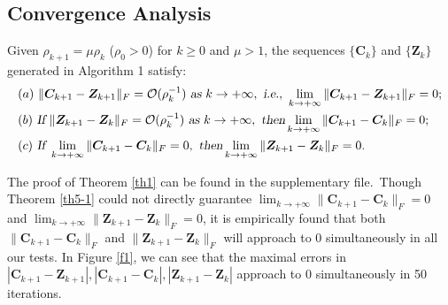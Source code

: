 \subsection{Convergence Analysis}


\begin{theorem}
\label{th5-1}
Given $\rho_{k+1}=\mu\rho_{k}$ ($\rho_{0}>0$) for $k\ge0$ and $\mu>1$, the sequences $\{\bm{C}_{k}\}$ and $\{\bm{Z}_{k}\}$ generated in Algorithm 1 satisfy:
\begin{align}
&
(a)\ 
\|\bm{C}_{k+1}-\bm{Z}_{k+1}\|_{F}=\mathcal{O}(\rho_{k}^{-1})
\ 
\textsl{as}\ k \to +\infty
,\ 
\textsl{i.e.},\ 
\lim_{k \to +\infty} \|\bm{C}_{k+1}-\bm{Z}_{k+1}\|_{F}=0;
\\
&
(b)\ 
\textsl{If}\ 
\|\bm{Z}_{k+1}-\bm{Z}_{k}\|_{F}=\mathcal{O}(\rho_{k}^{-1})
\ 
\textsl{as}\ k \to +\infty
,\ 
\textsl{then} 
\lim_{k \to +\infty} \|\bm{C}_{k+1}-\bm{C}_{k}\|_{F}=0;
\\
&
(c)\ 
\textsl{If}\ 
\lim_{k \to +\infty} \|\bm{C}_{k+1}-\bm{C}_{k}\|_{F}=0
,\ 
\textsl{then} 
\lim_{k \to +\infty} \|\bm{Z}_{k+1}-\bm{Z}_{k}\|_{F}=0.
\end{align}
\end{theorem}
The proof of Theorem \ref{th1} can be found in the supplementary file.\ Though Theorem \ref{th5-1} could not directly guarantee $\lim_{k \to +\infty}\|\bm{C}_{k+1}-\bm{C}_{k}\|_{F}=0$ and $\lim_{k \to +\infty}\|\bm{Z}_{k+1}-\bm{Z}_{k}\|_{F}=0$, it is empirically found that both $\|\bm{C}_{k+1}-\bm{C}_{k}\|_{F}$ and $\|\bm{Z}_{k+1}-\bm{Z}_{k}\|_{F}$ will approach to $0$ simultaneously in all our tests. In Figure \ref{f1}, we can see that the maximal errors in $|\bm{C}_{k+1}-\bm{Z}_{k+1}|,|\bm{C}_{k+1}-\bm{C}_{k}|,|\bm{Z}_{k+1}-\bm{Z}_{k}|$ approach to $0$ simultaneously in 50 iterations.


